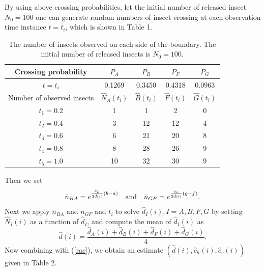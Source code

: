 \documentclass[11pt]{article}
\newcommand{\eq}{\begin{equation}\begin{array}{lllllllllllllllllllllllllllllllll}}
\newcommand{\ee}{\end{array}\end{equation}}
\begin{document}
By using above crossing probabilities, let the initial number of released insect $N_0=100$ one can generate random numbers of insect crossing at each observation time instance $t=t_i$, which is shown in Table 1. 
\begin{table}[!htbp]
\begin{center} %
\begin{tabular}{ccccc} %
\hline\hline                        %
 Crossing probability    & $P_A$ & $P_B$ & $P_F$ & $P_G$\\
\hline
$t=t_i$ & 0.1269  &  0.3450  &  0.4318  &  0.0963   \\ 
\hline\hline                        %
 Number of observed insects  & $\hat{N}_A(t_i)$ & $\hat{B}(t_i)$ & $\hat{F}(t_i)$ & $\hat{G}(t_i)$\\
\hline           
 $t_1=0.2$ & 1   &  1  &   2  &   0  \\
 $t_2=0.4$ & 3   & 12  &  12  &   4\\
 $t_3=0.6$ & 6   & 21  &  20  &   8 \\
 $t_4=0.8$ & 8   & 28  &  26  &   9\\
 $t_5=1.0$ & 10  &  32 &   30 &    9\\
\hline
\end{tabular}
\caption{The number of insects observed on each side of the boundary. The initial number of released insects is $N_0=100$. }
\label{table:nonlin} %
\end{center}
\end{table}
Then we set
\eq\label{rae}
\bar{n}_{BA}=e^{\frac{\hat{c}_h}{2\hat{d}(i)}(b-a)} \quad\hbox{and}\quad  \bar{n}_{GF}=e^{\frac{\hat{c}_v}{2\hat{d}(i)}(g-f)}.
\ee
Next we apply $\bar{n}_{BA}$ and $\bar{n}_{GF}$ and $t_i$ to solve $\hat{d}_I(i), I=A, B, F, G$ by setting $\hat{N}_I(i)$ as a function of $\hat{d}_I$, and compute the mean of $\hat{d}_I(i)$ as 
\[\hat{d}(i)=\frac{\hat{d}_A(i)+\hat{d}_B(i)+\hat{d}_F(i)+\hat{d}_G(i)}{4}.\]
Now combining with (\ref{rae}), we obtain an estimate $(\hat{d}(i), \hat{c}_h(i), \hat{c}_v(i))$ given in Table 2.
\end{document}
